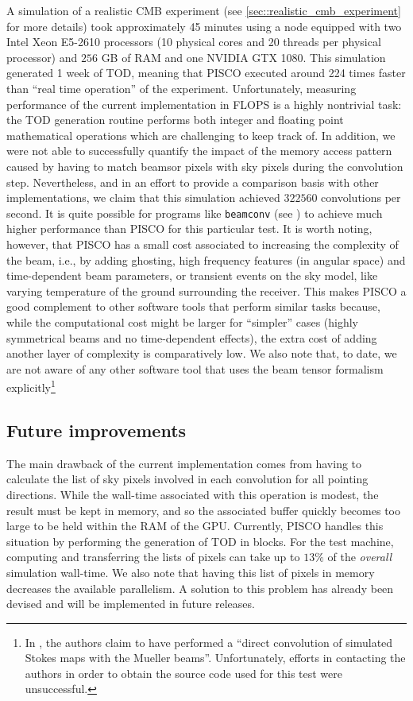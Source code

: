\documentclass[a4paper,11pt]{article}
\begin{document}
A simulation of a realistic CMB experiment (see \ref{sec::realistic_cmb_experiment} for more details) took approximately 45 minutes using a node equipped with two Intel Xeon E5-2610 processors (10 physical cores and 20 threads per physical processor) and $256$ GB of RAM and one NVIDIA GTX 1080. This simulation generated 1 week of TOD, meaning that PISCO executed around 224 times faster than ``real time operation'' of the experiment. Unfortunately, measuring performance of the current implementation in FLOPS is a highly nontrivial task: the TOD generation routine performs both integer and floating point mathematical operations which are challenging to keep track of. In addition, we were not able to successfully quantify the impact of the memory access pattern caused by having to match beamsor pixels with sky pixels during the convolution step. Nevertheless, and in an effort to provide a comparison basis with other implementations, we claim that this simulation achieved $322560$ convolutions per second. It is quite possible for programs like \texttt{beamconv} (see \cite{2018arXiv180905034D}) to achieve much higher performance than PISCO for this particular test. It is worth noting, however, that PISCO has a small cost associated to increasing the complexity of the beam, i.e., by adding ghosting, high frequency features (in angular space) and time-dependent beam parameters, or transient events on the sky model, like varying temperature of the ground surrounding the receiver. This makes PISCO a good complement to other software tools that perform similar tasks because, while the computational cost might be larger for ``simpler'' cases (highly symmetrical beams and no time-dependent effects), the extra cost of adding another layer of complexity is comparatively low. We also note that, to date, we are not aware of any other software tool that uses the beam tensor formalism explicitly\footnote{In \cite{2007MNRAS.376.1767O}, the authors claim to have performed a ``direct convolution of simulated Stokes maps with the Mueller beams''. Unfortunately, efforts in contacting the authors in order to obtain the source code used for this test were unsuccessful.}

\subsection{Future improvements}

The main drawback of the current implementation comes from having to calculate the list of sky pixels involved in each convolution for all pointing directions. While the wall-time associated with this operation is modest, the result must be kept in memory, and so the associated buffer quickly becomes too large to be held within the RAM of the GPU. Currently, PISCO handles this situation by performing the generation of TOD in blocks. For the test machine, computing and transferring the lists of pixels can take up to $13\%$ of the \textsl{overall} simulation wall-time. We also note that having this list of pixels in memory decreases the available parallelism. A solution to this problem has already been devised and will be implemented in future releases.
\end{document}
